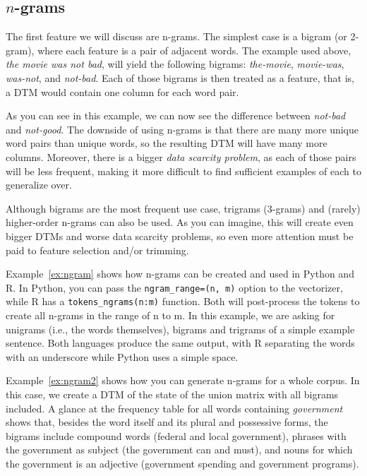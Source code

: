 \subsection{$n$-grams}\label{sec:ngrams}

The first feature we will discuss are n-grams.
The simplest case is a bigram (or 2-gram), where each feature is a pair of adjacent words.
The example used above, \emph{the movie was not bad}, will yield the following bigrams: \emph{the-movie}, \emph{movie-was}, \emph{was-not}, and \emph{not-bad}.
Each of those bigrams is then treated as a feature, that is, a DTM would contain one column for each word pair.

As you can see in this example, we can now see the difference between \emph{not-bad} and \emph{not-good}.
The downside of using n-grams is that there are many more unique word pairs than unique words,
so the resulting DTM will have many more columns.
Moreover, there is a bigger \emph{data scarcity problem}, as each of those pairs will be less frequent,
making it more difficult to find sufficient examples of each to generalize over.

Although bigrams are the most frequent use case, trigrams (3-grams) and (rarely) higher-order n-grams can also be used.
As you can imagine, this will create even bigger DTMs and worse data scarcity problems,
so even more attention must be paid to feature selection and/or trimming.



Example~\ref{ex:ngram} shows how n-grams can be created and used in Python and R.
In Python, you can pass the \verb|ngram_range=(n, m)| option to the vectorizer,
while R has a \verb|tokens_ngrams(n:m)| function.
Both will post-process the tokens to create all n-grams in the range of n to m.
In this example, we are asking for unigrams (i.e., the words themselves), bigrams and trigrams of a simple example sentence.
Both languages produce the same output, with R separating the words with an underscore while Python uses a simple space.


Example~\ref{ex:ngram2} shows how you can generate n-grams for a whole corpus.
In this case, we create a DTM of the state of the union matrix with all bigrams included.
A glance at the frequency table for all words containing \emph{government} shows that,
besides the word itself and its plural and possessive forms, the bigrams include compound words (federal and local government),
phrases with  the government as subject (the government can and must), and nouns for which the government is an adjective
(government spending and government programs).

